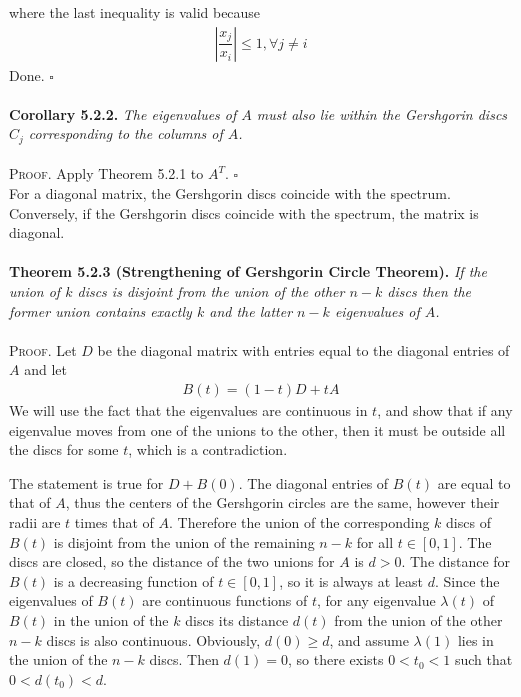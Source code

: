 \documentclass[a4paper,oneside]{book}
\numberwithin{equation}{chapter}
\begin{document}
where the last inequality is valid because
\begin{align}
\left| {\dfrac{{{x_j}}}{{{x_i}}}} \right| \le 1,\forall j \ne i
\end{align}
Done. \hfill $\square$\\
\\
\textbf{Corollary 5.2.2.} \textit{The eigenvalues of $A$ must also lie within the Gershgorin discs $C_j$ corresponding to the columns of $A$.}\\
\\
\textsc{Proof.} Apply Theorem 5.2.1 to $A^T$. \hfill $\square$\\

For a diagonal matrix, the Gershgorin discs coincide with the spectrum. Conversely, if the Gershgorin discs coincide with the spectrum, the matrix is diagonal.\\
\\
\textbf{Theorem 5.2.3 (Strengthening of Gershgorin Circle Theorem).} \textit{If the union of $k$ discs is disjoint from the union of the other $n-k$ discs then the former union contains exactly $k$ and the latter $n-k$ eigenvalues of $A$.}\\
\\
\textsc{Proof.} Let $D$ be the diagonal matrix with entries equal to the diagonal entries of $A$ and let
\begin{align}
B\left( t \right) = \left( {1 - t} \right)D + tA
\end{align}
We will use the fact that the eigenvalues are continuous in $t$, and show that if any eigenvalue moves from one of the unions to the other, then it must be outside all the discs for some $t$, which is a contradiction.

The statement is true for $D+B\left(0\right)$. The diagonal entries of $B\left(t\right)$ are equal to that of $A$, thus the centers of the Gershgorin circles are the same, however their radii are $t$ times that of $A$. Therefore the union of the corresponding $k$ discs of $B\left(t\right)$ is disjoint from the union of the remaining $n-k$ for all $t \in \left[0,1\right]$. The discs are closed, so the distance of the two unions for $A$ is $d>0$. The distance for $B\left(t\right)$ is a decreasing function of $t \in \left[0,1\right]$, so it is always at least $d$. Since the eigenvalues of $B\left(t\right)$ are continuous functions of $t$, for any eigenvalue $\lambda \left(t\right)$ of $B\left(t\right)$ in the  union of the $k$ discs its distance $d\left(t\right)$ from the union of the other $n-k$ discs is also continuous. Obviously, $d\left(0\right) \ge d$, and assume $\lambda \left(1\right)$ lies in the union of the $n-k$ discs. Then $d\left(1\right) =0$, so there exists $0<t_0<1$ such that $0<d\left(t_0\right)<d$.
\end{document}

